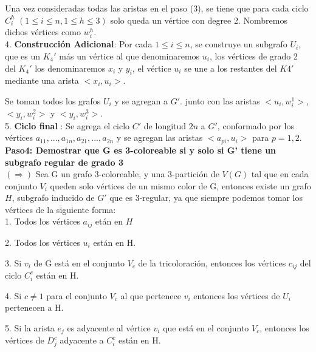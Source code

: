 \documentclass[
10pt, %
a4paper, %
oneside, %
headinclude,footinclude, %
BCOR5mm, %
]{scrartcl}
\begin{document}
Una vez consideradas todas las aristas en
el paso (3), se tiene que para cada ciclo $C^h_i$ $( 1\leq i \leq n, 1 \leq h \leq 3 )$ solo queda un vértice con degree 2. Nombremos
dichos vértices como $w^h_i$.\\

4. \textbf{Construcción Adicional}: Por cada $1 \leq i \leq n$, se construye un subgrafo $U_i$, que es un $K_4'$ más un vértice al que denominaremos $u_i$, los vértices de grado 2 del $K_4'$ los denominaremos 
$x_i$ y $y_i$, el vértice $u_i$ se une a los restantes del $K4'$ mediante una arista $<x_i, u_i>$. 

Se toman todos los grafos $U_i$ y se agregan a $G'$. junto con las aristas $<u_i,w^1_i>$, $<y_i, w^2_i>$ y $<y_i, w^3_i>$.\\


5. \textbf{Ciclo final} : Se agrega el ciclo $C'$ de longitud $2n$ a $G'$, conformado por los vértices ${a_{11},..., a_{1n}, a_{21},..., a_{2n}}$ y se agregan las aristas $<a_{pi}, u_i>$ para $p = 1,2$.\\


\textbf{Paso4: Demostrar que G es 3-coloreable si y solo si G' tiene un subgrafo regular de grado 3  }\\

$(\Rightarrow)$ Sea G un grafo 3-coloreable, y una 3-partición de $V(G)$ tal que en cada conjunto $V_i$ queden solo vértices de un mismo color de G, entonces existe un grafo $H$, 
subgrafo inducido de $G'$ que es 3-regular, ya que siempre podemos tomar los vértices de la siguiente forma:\\

1. Todos los vértices $a_{ij}$ etán en $H$

2. Todos los vértices $u_i$ est\'an en H.

3. Si $v_i$ de G est\'a en el conjunto $V_c$ de la tricoloraci\'on, entonces los v\'ertices $c_{ij}$ del ciclo $C^c_i$ est\'an en H.

4. Si $ c \neq 1$ para el conjunto $V_c$ al que pertenece $v_i$ entonces los vértices de $U_i$ pertenecen a H.

5. Si la arista $e_j$ es adyacente al v\'ertice $v_i$ que est\'a en el conjunto $V_c$, entonces los v\'ertices de $D^c_j$ adyacente a $C^c_i$ est\'an en H. \\
\end{document}

